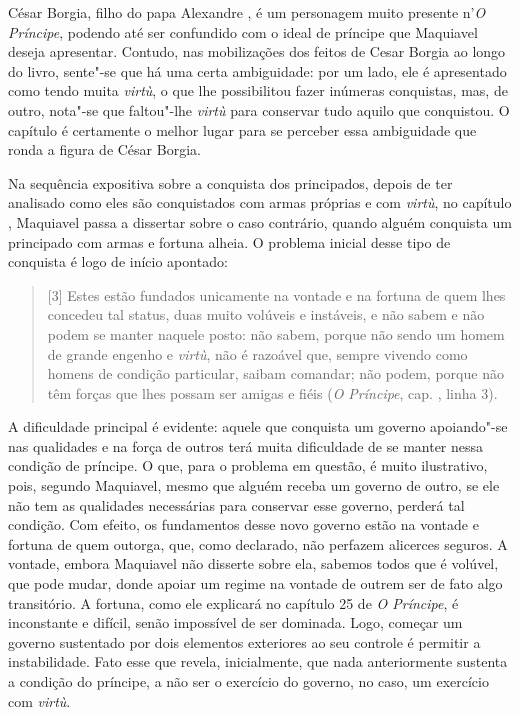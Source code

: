 César Borgia, filho do papa Alexandre , é um personagem muito presente
n'\emph{O Príncipe}, podendo até ser confundido com o ideal de príncipe
que Maquiavel deseja apresentar. Contudo, nas mobilizações dos feitos de
Cesar Borgia ao longo do livro, sente"-se que há uma certa ambiguidade:
por um lado, ele é apresentado como tendo muita \emph{virtù}, o que lhe
possibilitou fazer inúmeras conquistas, mas, de outro, nota"-se que
faltou"-lhe \emph{virtù} para conservar tudo aquilo que conquistou. O
capítulo  é certamente o melhor lugar para se perceber essa
ambiguidade que ronda a figura de César Borgia.

Na sequência expositiva sobre a conquista dos principados, depois de ter
analisado como eles são conquistados com armas próprias e com
\emph{virtù}, no capítulo , Maquiavel passa a dissertar sobre o caso
contrário, quando alguém conquista um principado com armas e fortuna
alheia. O problema inicial desse tipo de conquista é logo de início
apontado:

\begin{quote}
{[}3{]} Estes estão fundados unicamente na vontade e na fortuna
de quem lhes concedeu tal status, duas muito volúveis e instáveis, e não
sabem e não podem se manter naquele posto: não sabem, porque não
sendo um homem de grande engenho e \emph{virtù},
não é razoável que, sempre vivendo como homens de condição
particular, saibam comandar; não podem, porque não
têm forças que lhes possam ser amigas e fiéis (\emph{O Príncipe}, cap.
, linha 3).
\end{quote}

A dificuldade principal é evidente: aquele que conquista um governo
apoiando"-se nas qualidades e na força de outros terá muita dificuldade
de se manter nessa condição de príncipe. O que, para o problema em
questão, é muito ilustrativo, pois, segundo Maquiavel, mesmo que alguém
receba um governo de outro, se ele não tem as qualidades necessárias
para conservar esse governo, perderá tal condição. Com efeito, os
fundamentos desse novo governo estão na vontade e fortuna de quem
outorga, que, como declarado, não perfazem alicerces seguros. A vontade,
embora Maquiavel não disserte sobre ela, sabemos todos que é volúvel,
que pode mudar, donde apoiar um regime na vontade de outrem ser de fato
algo transitório. A fortuna, como ele explicará no capítulo 25 de
\emph{O Príncipe}, é inconstante e difícil, senão impossível de ser
dominada. Logo, começar um governo sustentado por dois elementos
exteriores ao seu controle é permitir a instabilidade. Fato esse que
revela, inicialmente, que nada anteriormente sustenta a condição do
príncipe, a não ser o exercício do governo, no caso, um exercício com
\emph{virtù}.

